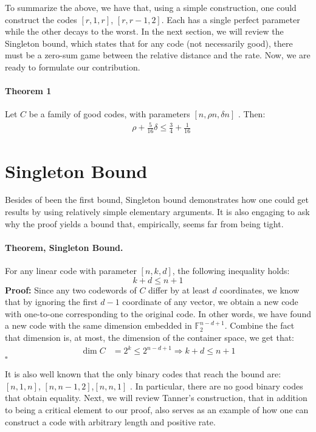 \documentclass{article}
\newcommand{\PonB}{ \rho + \frac{5}{16}\delta\le \frac{3}{4} + \frac{1}{16} }
\newcommand{\Cpa}{[n, \rho n, \delta n]}
\begin{document}
\begin{multicols*}{2}
To summarize the above, we have that, using a simple construction, one could construct the codes $[r, 1, r]$, $[r, r-1, 2]$. Each has a single perfect parameter while the other decays to the worst. In the next section, we will review the Singleton bound, which states that for any code (not necessarily good), there must be a zero-sum game between the relative distance and the rate.
Now, we are ready to formulate our contribution. 

\paragraph{Theorem 1}  Let $C$ be a family of good codes, with parameters $\Cpa$ . Then: \begin{equation*}
  \begin{split}
    & \PonB 
  \end{split}
\end{equation*}

\section{Singleton Bound}  
Besides of been the first bound, Singleton bound demonstrates how one could get results by using relatively simple elementary arguments. It is also engaging to ask why the proof yields a bound that, empirically, seems far from being tight.
\paragraph{Theorem, Singleton Bound.} For any linear code with parameter $[n,k,d]$, the following inequality holds:
\begin{equation*}
    k+ d \le n + 1
\end{equation*} 
\textbf{Proof:} Since any two codewords of $C$ differ by at least $d$ coordinates, we know that by ignoring the first $d-1$ coordinate of any vector, we obtain a new code with one-to-one corresponding to the original code. In other words, we have found a new code with the same dimension embedded in $\mathbb{F}_{2}^{n-d+1}$. Combine the fact that dimension is, at most, the dimension of the container space, we get that:  
\begin{equation*}
  \begin{split}
    \dim C &= 2^{k} \le 2^{n-d+1} \Rightarrow k+d \le n + 1
  \end{split}
\end{equation*}
$\square$

It is also well known that the only binary codes that reach the bound are: $[n,1,n]$, $[n,n-1,2]$,$[n,n,1]$ \cite{eczoo_mds}. In particular, there are no good binary codes that obtain equality. Next, we will review Tanner's construction, that in addition to being a critical element to our proof, also serves as an example of how one can construct a code with arbitrary length and positive rate.

\end{multicols*}
\end{document}

